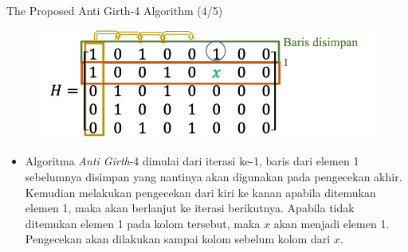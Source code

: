 \documentclass[11pt, aspectratio=169]{beamer}
\begin{document}
\begin{frame}{The Proposed Anti Girth-4 Algorithm (4/5)}
	
	\centering 
	\begin{figure}
		\centering 
		\includegraphics[scale=0.65]{gambarafa/step5}
		\centering 
	\end{figure}
	\begin{itemize}
		\item[5.] Algoritma \textit{Anti Girth}-4 dimulai dari iterasi ke-1, baris dari elemen 1 sebelumnya disimpan yang nantinya akan digunakan pada pengecekan akhir. Kemudian melakukan pengecekan dari kiri ke kanan apabila ditemukan elemen 1, maka akan berlanjut ke iterasi berikutnya. Apabila tidak ditemukan elemen 1 pada kolom tersebut, maka $x$ akan menjadi elemen 1. Pengecekan akan dilakukan sampai kolom sebelum kolom dari $x$.
	\end{itemize}





\end{frame}
\end{document}

